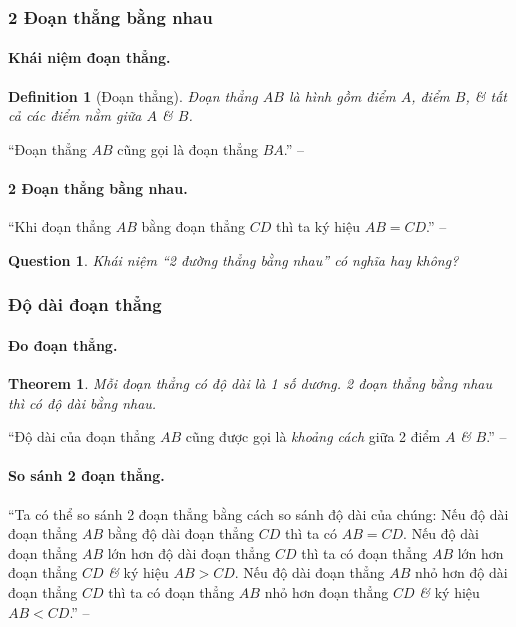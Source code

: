 \documentclass{article}
\numberwithin{equation}{section}
\newtheorem{definition}{Definition}[section]
\newtheorem{question}{Question}[section]
\newtheorem{theorem}{Theorem}[section]
\begin{document}
\subsubsection{2 Đoạn thẳng bằng nhau}

\paragraph{Khái niệm đoạn thẳng.}
\begin{definition}[Đoạn thẳng]
	\emph{Đoạn thẳng $AB$} là hình gồm điểm $A$, điểm $B$, \textit{\&} tất cả các điểm nằm giữa $A$ \textit{\&} $B$.
\end{definition}
``Đoạn thẳng $AB$ cũng gọi là đoạn thẳng $BA$.'' -- \cite[p. 84]{Thai_Anh_Dat_Ha_Loan_Nam_Quang_Toan_6_tap_2}

\paragraph{2 Đoạn thẳng bằng nhau.} ``Khi đoạn thẳng $AB$ bằng đoạn thẳng $CD$ thì ta ký hiệu $AB = CD$.'' -- \cite[p. 85]{Thai_Anh_Dat_Ha_Loan_Nam_Quang_Toan_6_tap_2}

\begin{question}
	Khái niệm ``2 đường thẳng bằng nhau'' có nghĩa hay không?
\end{question}

\subsubsection{Độ dài đoạn thẳng}

\paragraph{Đo đoạn thẳng.}
\begin{theorem}
	Mỗi đoạn thẳng có độ dài là 1 số dương. 2 đoạn thẳng bằng nhau thì có độ dài bằng nhau.
\end{theorem}
``Độ dài của đoạn thẳng $AB$ cũng được gọi là \textit{khoảng cách} giữa 2 điểm $A$ \textit{\&} $B$.'' -- \cite[p. 85]{Thai_Anh_Dat_Ha_Loan_Nam_Quang_Toan_6_tap_2}

\paragraph{So sánh 2 đoạn thẳng.} ``Ta có thể so sánh 2 đoạn thẳng bằng cách so sánh độ dài của chúng: Nếu độ dài đoạn thẳng $AB$ bằng độ dài đoạn thẳng $CD$ thì ta có $AB = CD$. Nếu độ dài đoạn thẳng $AB$ lớn hơn độ dài đoạn thẳng $CD$ thì ta có đoạn thẳng $AB$ lớn hơn đoạn thẳng $CD$ \textit{\&} ký hiệu $AB > CD$. Nếu độ dài đoạn thẳng $AB$ nhỏ hơn độ dài đoạn thẳng $CD$ thì ta có đoạn thẳng $AB$ nhỏ hơn đoạn thẳng $CD$ \textit{\&} ký hiệu $AB < CD$.'' -- \cite[p. 86]{Thai_Anh_Dat_Ha_Loan_Nam_Quang_Toan_6_tap_2}
\end{document}
